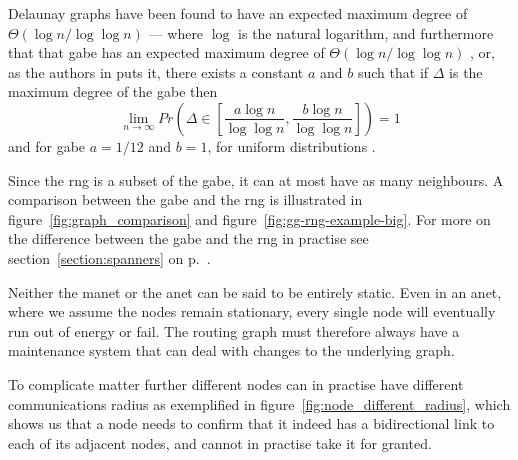 Delaunay graphs have been found to have an expected maximum degree of $\Theta(\log n / \log \log n)$ \cite{delExpected} --- where $\log$ is the natural logarithm, and furthermore that that \ac{gabe} has an expected maximum degree of $\Theta(\log n / \log \log n)$ \cite{GGExpected}, or, as the authors in \cite{GGExpected} puts it, there exists a constant $a$ and $b$ such that if $\Delta$ is the maximum degree of the \ac{gabe} then 
$$
\lim_{n \rightarrow \infty} Pr\left({\Delta \in \left[\frac{a\log n}{\log \log n}, \frac{b\log n}{\log \log n}\right]}\right) = 1
$$
and for \ac{gabe} $a = 1/12$ and $b = 1$, for uniform distributions \cite{GGExpected}.

Since the \ac{rng} is a subset of the \ac{gabe}, it can at most have as many neighbours. A comparison between the \ac{gabe} and the \ac{rng} is illustrated in figure~\ref{fig:graph_comparison} and figure~\ref{fig:gg-rng-example-big}. For more on the difference between the \ac{gabe} and the \ac{rng} in practise see section~\ref{section:spanners} on p.~\pageref{section:spanners}.


Neither the \ac{manet} or the \ac{anet} can be said to be entirely static. Even in an \ac{anet}, where we assume the nodes remain stationary, every single node will eventually run out of energy or fail. The routing graph must therefore always have a maintenance system that can deal with changes to the underlying graph. 

To complicate matter further different nodes can in practise have different communications radius as exemplified in figure~\ref{fig:node_different_radius}, which shows us that a node needs to confirm that it indeed has a bidirectional link to each of its adjacent nodes, and cannot in practise take it for granted.


